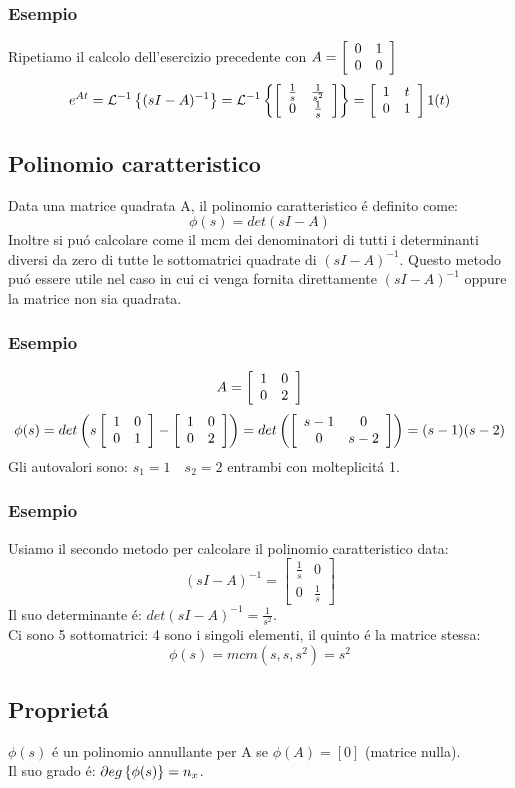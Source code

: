 \documentclass[../main.tex]{subfiles}
\begin{document}
\begin{itemize}
				\subsubsection*{Esempio}
					Ripetiamo il calcolo dell'esercizio precedente con $ A = \left[ \begin{array}{cc} 0 & 1\\ 0 & 0 \end{array} \right] $
					\[ e^{At} = \mathcal{L}^{-1} \left\lbrace (sI-A)^{-1} \right\rbrace = \mathcal{L}^{-1} \left\lbrace \left[ \begin{array}{cc} \frac{1}{s} & \frac{1}{s^2}\\ 0 & \frac{1}{s} \end{array} \right] \right\rbrace = \left[ \begin{array}{cc} 1 & t\\ 0 & 1 \end{array} \right] 1(t) \]
		\end{itemize}
	
	\subsection{Polinomio caratteristico}
		Data una matrice quadrata A, il polinomio caratteristico \'e definito come:
		\[ \phi(s) = det(sI - A) \]
		Inoltre si pu\'o calcolare come il mcm dei denominatori di tutti i determinanti diversi da zero di tutte le sottomatrici quadrate di $ (sI-A)^{-1} $. Questo metodo pu\'o essere utile nel caso in cui ci venga fornita direttamente $ (sI-A)^{-1} $ oppure la matrice non sia quadrata.
	\subsubsection*{Esempio}
		\[ A = \left[ \begin{array}{cc} 1 & 0\\ 0 & 2 \end{array} \right] \]
		\[ \phi(s) = det \left( s \left[ \begin{array}{cc} 1 & 0\\ 0 & 1 \end{array} \right] - \left[ \begin{array}{cc} 1 & 0\\ 0 & 2 \end{array} \right] \right) = det \left( \left[ \begin{array}{cc} s-1 & 0\\ 0 & s-2 \end{array} \right] \right) = (s-1)(s-2) \]
		Gli autovalori sono: $ s_1 = 1 \quad s_2 = 2 $ entrambi con molteplicit\'a 1.
	\subsubsection*{Esempio}
		Usiamo il secondo metodo per calcolare il polinomio caratteristico data:
		\[
			(sI-A)^{-1} =
			\begin{bmatrix}
				\frac{1}{s} & 0\\
				0 & \frac{1}{s}
			\end{bmatrix}
		\]
		Il suo determinante \'e: $ det (sI-A)^{-1} = \frac{1}{s^2} $.\\
		Ci sono 5 sottomatrici: 4 sono i singoli elementi, il quinto \'e la matrice stessa:
		\[ \phi(s) = mcm(s, s, s^2) = s^2 \]
	\subsection*{Propriet\'a}
		$ \phi(s) $ \'e un polinomio annullante per A se $ \phi(A) = [0] $ (matrice nulla).\\
		Il suo grado \'e: $ \partial eg \left\lbrace \phi(s) \right\rbrace = n_x $.
\end{document}
